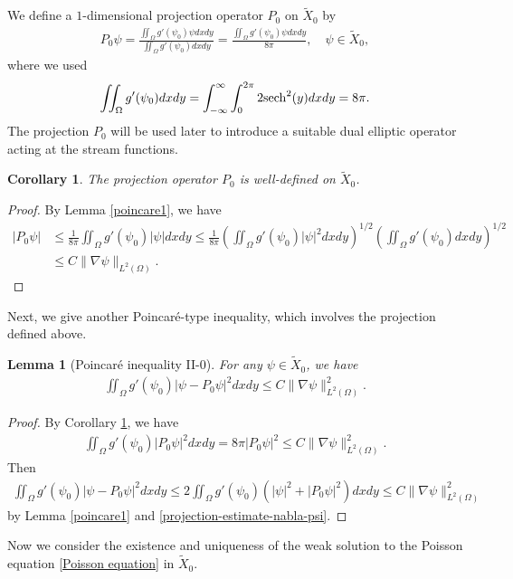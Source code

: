 \documentclass[1 [leqno, 11pt]{amsart}
\numberwithin{equation}{section}
\def\sech{{\rm{sech}}}
\newtheorem{lemma}[Theorem]{Lemma}
\newtheorem{Corollary}[Theorem]{Corollary}
\begin{document}
\begin{CJK*}{GBK}{song}
We define  a $1$-dimensional projection operator $P_0$ on $ \tilde{X}_0$ by
\begin{align}\label{P0-psi-def}
P_0\psi = \frac{\iint_\Omega g'(\psi_0)\psi dxdy}{\iint_\Omega g'(\psi_0) dxdy}=\frac{\iint_\Omega g'(\psi_0)\psi dxdy}{8\pi},\quad \psi \in \tilde{X}_0,
\end{align}
where we used
 $$\iint_\Omega g'(\psi_0) dxdy = \int_{-\infty}^{\infty} \int_0^{2\pi} 2 \sech^2(y) dxdy = 8\pi.$$
The projection $P_0$ will be used later to introduce  a suitable dual elliptic operator acting at the stream functions.
\begin{Corollary}\label{projection}
 The projection operator $P_0 $ is well-defined  on $ \tilde{X}_0$.
\end{Corollary}
\begin{proof}
By  Lemma \ref{poincare1}, we have
\begin{align}\nonumber
|P_0\psi|
& \leq \frac{1}{8\pi} \iint_\Omega g'(\psi_0)|\psi| dxdy
 \leq \frac{1}{8\pi} \left(\iint_\Omega g'(\psi_0)|\psi|^2 dxdy\right)^{1/2} \left( \iint_\Omega g'(\psi_0)dxdy \right)^{1/2} \\\label{p0-psi-estimates-2}
& \leq C \|\nabla \psi\|_{L^2(\Omega)}.
\end{align}
\end{proof}
Next, we give another Poincar\'e-type  inequality, which involves the projection defined above.
\begin{lemma}[Poincar\'e inequality II-$0$]\label{poincare2}
For any $\psi \in \tilde{X}_0$,
we have
\begin{align}\label{Poincare inequality II022}
\iint_\Omega g'(\psi_0)|\psi - P_0\psi|^2 dxdy  \leq C \|\nabla \psi\|_{L^2(\Omega)}^2.
\end{align}
\end{lemma}
\begin{proof}
By Corollary \ref{projection}, we have
\begin{align}\label{projection-estimate-nabla-psi}
\iint_\Omega g'(\psi_0)|P_0\psi|^2 dxdy = 8\pi |P_0\psi|^2 \leq C \|\nabla \psi\|_{L^2(\Omega)}^2.
\end{align}
Then
\begin{align*}
\iint_\Omega g'(\psi_0)|\psi - P_0\psi|^2 dxdy  \leq 2 \iint_\Omega g'(\psi_0)\left(|\psi|^2  + |P_0\psi|^2 \right)dxdy  \leq C  \|\nabla \psi\|_{L^2(\Omega)}^2
\end{align*}
by  Lemma \ref{poincare1} and \eqref{projection-estimate-nabla-psi}.
\end{proof}
Now we consider the existence and uniqueness of the weak solution to the Poisson equation \eqref{Poisson equation} in $\tilde{X}_0$.

\end{CJK*}
\end{document}
